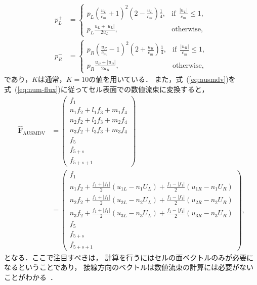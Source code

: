\begin{align}
    p_{L}^{+} &= 
    \begin{cases}
        p_{L}\left(\frac{u_{L}}{c_{m}}+1\right)^{2}\left(2-\frac{u_{L}}{c_{m}}\right) \frac{1}{4}, & \mathrm{if}\ \  \frac{\left|u_{L}\right|}{c_{m}} \leq 1, \\
        p_{L} \frac{u_{L}+\left|u_{L}\right|}{2 u_{L}}, & \text{otherwise},
    \end{cases}\\
    p_{R}^{-} &= 
    \begin{cases}
        p_{R}\left(\frac{u_{R}}{c_{m}}-1\right)^{2}\left(2+\frac{u_{R}}{c_{m}}\right) \frac{1}{4}, & \mathrm{if}\ \  \frac{\left|u_{R}\right|}{c_{m}} \leq 1, \\
        p_{R} \frac{u_{R}+\left|u_{R}\right|}{2 u_{R}}, & \text{otherwise},
    \end{cases}
\end{align}
であり，$K$は通常，$K=10$の値を用いている．
また，式~(\ref{eq:ausmdv})を式~(\ref{eq:num-flux})に従ってセル表面での数値流束に変換すると，
\begin{align}
\hat{\bm{F}}_\mathrm{AUSMDV}&=\begin{pmatrix}
f_{1} \\
n_{1} f_{2}+l_{1} f_{3}+m_{1} f_{4} \\
n_{2} f_{2}+l_{2} f_{3}+m_{2} f_{4} \\
n_{3} f_{2}+l_{3} f_{3}+m_{3} f_{4} \\
f_{5} \\
f_{5+s} \\
f_{5+s+1}
\end{pmatrix} \nonumber \\
&=\begin{pmatrix}
f_{1} \\
n_{1} f_{2}+\frac{f_{1}+\left|f_{1}\right|}{2}\left(u_{1 L}-n_{1} U_{L}\right)+\frac{f_{1}-\left|f_{1}\right|}{2}\left(u_{1 R}-n_{1} U_{R}\right) \\
n_{2} f_{2}+\frac{f_{1}+ \left|f_{1}\right|}{2}\left(u_{2 L}-n_{2} U_{L}\right)+\frac{f_{1}-\left|f_{1}\right|}{2}\left(u_{2 R}-n_{2} U_{R}\right) \\
n_3f_{2}+\frac{f_{1}+\left|f_{1}\right|}{2}\left(u_{3 L}-n_{3} U_{L}\right)+\frac{f_{1}-\left|f_{1}\right|}{2}\left(u_{3 R}-n_{3} U_{R}\right) \\
f_{5} \\
f_{5+s} \\
f_{5+s+1}
\end{pmatrix},
\end{align}
となる．ここで注目すべきは，
計算を行うにはセルの面ベクトルのみが必要になるということであり，
接線方向のベクトルは数値流束の計算には必要がないことがわかる~\cite{takagi2000}．